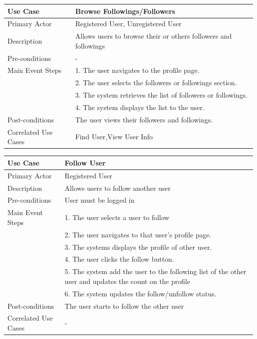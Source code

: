 \begin{longtable}{|p{}|p{}|}
    \hline
    \rowcolor{lightblue}
    \textbf{Use Case} & \textbf{Browse Followings/Followers} \\
    \hline
    Primary Actor & Registered User, Unregistered User\\
    \hline
    Description & Allows users to browse their or others followers and followings\\
    \hline
    Pre-conditions & - \\
    \hline
    Main Event Steps & 1. The user navigates to the profile page.\\
    & 2. The user selects the followers or followings section. \\
    & 3. The system retrieves the list of followers or followings. \\
    & 4. The system displays the list to the user. \\
    \hline
    Post-conditions & The user views their followers and followings.\\
    \hline
    Correlated Use Cases &Find User,View User Info \\
    \hline
\end{longtable}

\begin{longtable}{|p{}|p{}|}
    \hline
    \rowcolor{lightblue}
    \textbf{Use Case} & \textbf{Follow User} \\
    \hline
    Primary Actor & Registered User\\
    \hline
    Description & Allows users to follow another user\\
    \hline
    Pre-conditions & User must be logged in\\
    \hline
    Main Event Steps &  1. The user selects a user to follow \\
    & 2. The user navigates to that user's profile page. \\
    & 3. The systems displays the profile of other user. \\
    & 4. The user clicks the follow button. \\
    & 5. The system add the user to the following list of the other user and updates the count on the profile \\
    & 6. The system updates the follow/unfollow status. \\
    \hline
    Post-conditions &The user starts to follow the other user \\
    \hline
    Correlated Use Cases & -\\
    \hline
\end{longtable}

